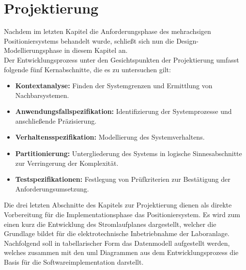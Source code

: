 \documentclass[../../Bachelorarbeit.tex]{subfiles}
\begin{document}
\section{Projektierung}
Nachdem im letzten Kapitel die Anforderungsphase des mehrachsigen Positioniersystems behandelt wurde, schließt sich nun die Design- \bzw Modellierungsphase in diesem Kapitel an.\\
Der Entwicklungsprozess unter den Gesichtspunkten der Projektierung umfasst folgende fünf Kernabschnitte, die es zu untersuchen gilt:

\begin{itemize}
    \item \textbf{Kontextanalyse:} Finden der Systemgrenzen und Ermittlung von Nachbarsystemen.
    \item \textbf{Anwendungsfallspezifikation:} Identifizierung der Systemprozesse und anschließende Präzisierung.
    \item \textbf{Verhaltensspezifikation:} Modellierung des Systemverhaltens.
    \item \textbf{Partitionierung:} Untergliederung des Systems in logische Sinnesabschnitte zur Verringerung der Komplexität.
    \item \textbf{Testspezifikationen:} Festlegung von Prüfkriterien zur Bestätigung der Anforderungsumsetzung.
\end{itemize}

Die drei letzten Abschnitte des Kapitels zur Projektierung dienen als direkte Vorbereitung für die Implementationsphase das Positioniersystem. Es wird zum einen kurz die Entwicklung des Stromlaufplanes dargestellt, welcher die Grundlage bildet für die elektrotechnische Inbetriebnahme der Laboranlage.
Nachfolgend soll in tabellarischer Form das Datenmodell aufgestellt werden, welches zusammen mit den \acs{uml} Diagrammen aus dem Entwicklungsprozess die Basis für die Softwareimplementation darstellt.
\end{document}
